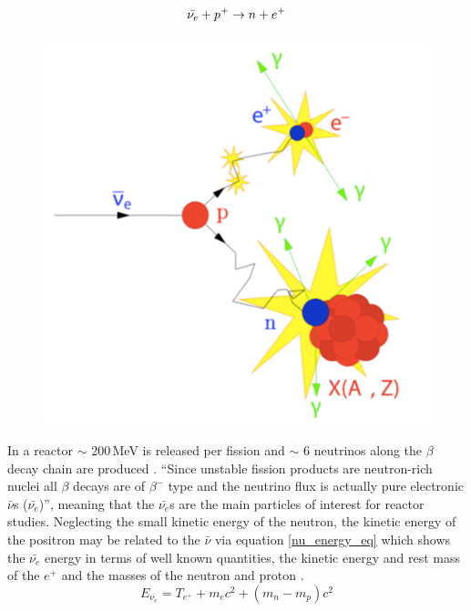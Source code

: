 \begin{equation}
    \Bar{\nu_e} + p^+ \rightarrow n + e^+
    \label{inverse_beta_decay}
\end{equation}

\begin{figure}[!h]
  \centering
  \includegraphics[width=0.5\linewidth]{Chapter2/Figs/Raster/inverse_beta_diagram.png} 
  \label{fig:inverse_beta_diagram}
\end{figure}

In a reactor $\sim$ 200\,MeV is released per fission and $\sim$ 6 neutrinos along the $\beta$ decay chain are produced \cite{Mueller_2011}. ``Since unstable fission products are neutron-rich nuclei all $\beta$ decays are of $\beta^-$ type and the neutrino flux is actually pure electronic $\bar{\nu}$s ($\bar{\nu_e}$)''\cite{Mueller_2011}, meaning that the $\bar{\nu_e}$s are the main particles of interest for reactor studies. Neglecting the small kinetic energy of the neutron, the kinetic energy of the positron may be related to the $\bar{\nu}$ via equation \ref{nu_energy_eq} which shows the $\bar{\nu_e}$ energy in terms of well known quantities, the kinetic energy and rest mass of the $e^+$ and the masses of the neutron and proton \cite{Vogel_1999}. 
\begin{equation}
 E_{\bar{\nu_e}} = T_{e^+} + m_{e}c^2 + (m_n - m_p)c^2  %
\label{nu_energy_eq}
\end{equation}

